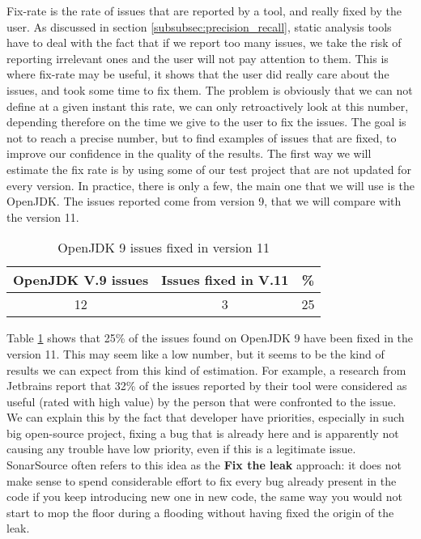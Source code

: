 Fix-rate is the rate of issues that are reported by a tool, and really fixed by the user. 
As discussed in section \ref{subsubsec:precision_recall}, static analysis tools have to deal with the fact that if we report too many issues, we take the risk of reporting irrelevant ones and the user will not pay attention to them. 
This is where fix-rate may be useful, it shows that the user did really care about the issues, and took some time to fix them. \newline
The problem is obviously that we can not define at a given instant this rate, we can only retroactively look at this number, depending therefore on the time we give to the user to fix the issues.
The goal is not to reach a precise number, but to find examples of issues that are fixed, to improve our confidence in the quality of the results.\newline
The first way we will estimate the fix rate is by using some of our test project that are not updated for every version. 
In practice, there is only a few, the main one that we will use is the OpenJDK. 
The issues reported come from version 9, that we will compare with the version 11.

\begin{table}[h]
	\centering
	\caption{OpenJDK 9 issues fixed in version 11}
	\label{table:openJDK_issues}
	\begin{tabular}{|c|c|c|}
		\hline
		\bf OpenJDK V.9  issues & \bf Issues fixed in V.11 & \bf \% \\ \hline
		12 &  3 &  25 \\ \hline
	\end{tabular}
\end{table}

Table \ref{table:openJDK_issues} shows that 25\% of the issues found on OpenJDK 9 have been fixed in the version 11. 
This may seem like a low number, but it seems to be the kind of results we can expect from this kind of estimation.
For example, a research from Jetbrains \cite{Bryksin:2018:DAK:3236454.3236457} report that 32\% of the issues reported by their tool were considered as useful (rated with high value) by the person that were confronted to the issue. 
We can explain this by the fact that developer have priorities, especially in such big open-source project, fixing a bug that is already here and is apparently not causing any trouble have low priority, even if this is a legitimate issue. 
SonarSource often refers to this idea as the \textbf{Fix the leak} approach: it does not make sense to spend considerable effort to fix every bug already present in the code if you keep introducing new one in new code, the same way you would not start to mop the floor during a flooding without having fixed the origin of the leak.

